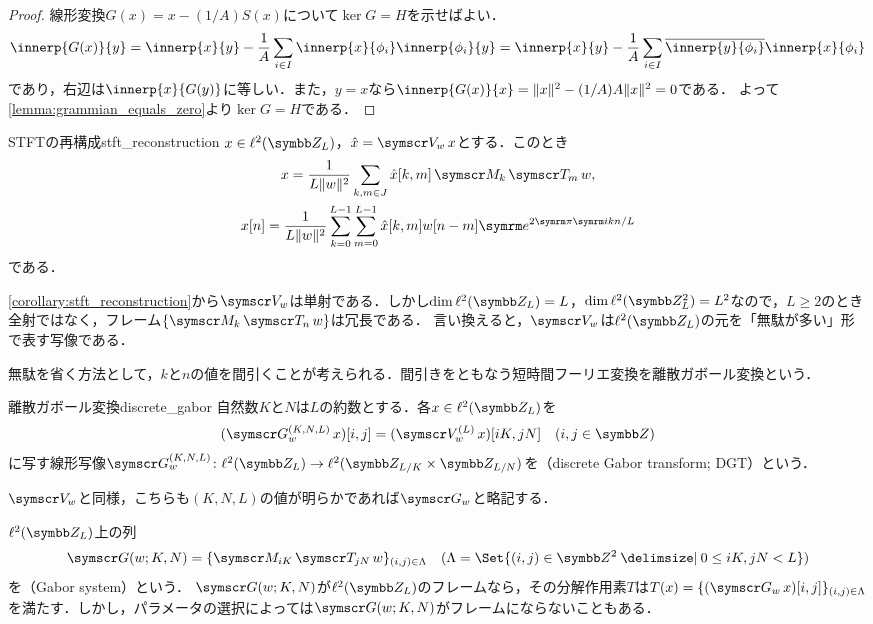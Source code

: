 \documentclass[../../main]{subfiles}
\begin{document}
\begin{proof}
  線形変換\(G(x)=x-(1/A)S(x)\)について\(\ker G=H\)を示せばよい．
  \[
    \innerp{G(x)}{y} = \innerp{x}{y}-\frac{1}{A}\sum_{i\in I}\innerp{x}{\phi_i}\innerp{\phi_i}{y}
    = \innerp{x}{y}-\frac{1}{A}\sum_{i\in I}\conj*{\innerp{y}{\phi_i}}\innerp{x}{\phi_i}
  \]
  であり，右辺は\(\innerp{x}{G(y)}\)に等しい．また，\(y=x\)なら\(\innerp{G(x)}{x}=\vnorm{x}^2-(1/A)A\vnorm{x}^2=0\)である．
  よって\cref{lemma:grammian_equals_zero}より\(\ker G=H\)である．
\end{proof}

\begin{corollary}{STFTの再構成}{stft_reconstruction}
  \(x\in\cycles{L}\)，\(\hat{x}=\stft{w}x\)とする．このとき
  \begin{gather*}
    x = \frac{1}{L\vnorm{w}^2}\sum_{k,m\in J}\hat{x}[k,m]\modulate{k}\translate{m}w, \\
    x[n] = \frac{1}{L\vnorm{w}^2}\sum_{k=0}^{L-1}\sum_{m=0}^{L-1}\hat{x}[k,m]w[n-m]\napr^{2\krez\iuni kn/L}
  \end{gather*}
  である．
\end{corollary}

\cref{corollary:stft_reconstruction}から\(\stft{w}\)は単射である．しかし\(\dim\cycles{L}=L\)，\(\dim\doublecycles{L}=L^2\)なので，\(L\geq 2\)のとき全射ではなく，フレーム\(\seq{\modulate{k}\translate{n}w}\)は冗長である．
言い換えると，\(\stft{w}\)は\(\cycles{L}\)の元を「無駄が多い」形で表す写像である．

無駄を省く方法として，\(k\)と\(n\)の値を間引くことが考えられる．間引きをともなう短時間フーリエ変換を離散ガボール変換という．

\begin{definition}{離散ガボール変換}{discrete_gabor}
  自然数\(K\)と\(N\)は\(L\)の約数とする．各\(x\in\cycles{L}\)を
  \[
    (\dgt[K,N,L]{w}x)[i,j] = (\stft[L]{w}x)[iK,jN]\quad(i,j\in\numset{Z})
  \]
  に写す線形写像\(\dgt[K,N,L]{w}\colon\cycles{L}\to\doublecycles[L/K]{L/N}\)を（discrete Gabor transform; DGT）という．
\end{definition}

\(\stft{w}\)と同様，こちらも\((K,N,L)\)の値が明らかであれば\(\dgt{w}\)と略記する．

\(\cycles{L}\)上の列
\[
  \gaborsys{w}{K}{N} = \seq{\modulate{iK}\translate{jN}w}_{(i,j)\in\Lambda}\quad(\Lambda=\Set{(i,j)\in\numset{Z}^2\given 0\leq iK,jN<L})
\]
を（Gabor system）という．
\(\gaborsys{w}{K}{N}\)が\(\cycles{L}\)のフレームなら，その分解作用素\(T\)は\(T(x)=\seq{(\dgt{w}x)[i,j]}_{(i,j)\in\Lambda}\)を満たす．しかし，パラメータの選択によっては\(\gaborsys{w}{K}{N}\)がフレームにならないこともある．
\end{document}
